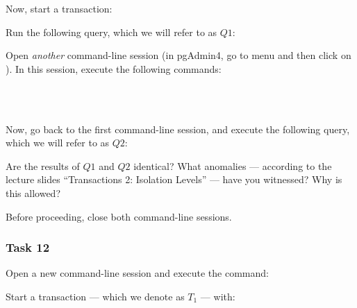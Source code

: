 \noindent Now, start a transaction:

\vgap

\noindent {}

\vgap

\noindent Run the following query, which we will refer to as $Q1$:

\vgap

\noindent {}

\vgap

\noindent Open {\em another} command-line session (in pgAdmin4, go to menu  and then click on ). In this session, execute the following commands:

\vgap

\noindent {}  \\
\noindent {}  \\
\noindent {}

\vgap

\noindent Now, go back to the first command-line session, and execute the following query, which we will refer to as $Q2$:

\vgap

\noindent {}

\vgap

\noindent Are the results of $Q1$ and $Q2$ identical? What anomalies --- according to the lecture slides ``Transactions 2:
Isolation Levels'' --- have you witnessed? Why is this allowed?

\vgap

\noindent Before proceeding, close both command-line sessions.

\subsubsection{Task 12}

Open a new command-line session and execute the command:

\vgap

\noindent {}

\vgap

\noindent Start a transaction --- which we denote as $T_1$ --- with:

\vgap

\noindent {}

